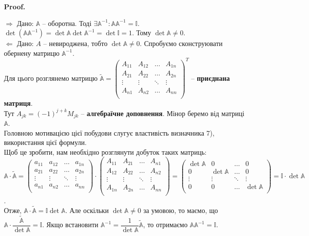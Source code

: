 \documentclass[a4paper, 10pt]{article}
\makeatletter
\def\rightproof{$\boxed{\Rightarrow}$ }
\def\leftproof{$\boxed{\Leftarrow}$ }
\theoremstyle{theoremdd}
\renewenvironment{proof}[1][Proof.\\]{\par
\pushQED{\hfill \qed}%
\normalfont \topsep6\p@\@plus6\p@\relax
\trivlist
\item\relax
{\bfseries
#1\@addpunct{.}}\hspace\labelsep\ignorespaces
}{%
\popQED\endtrivlist\@endpefalse
}
\makeatother
\begin{document}
\begin{proof}
\rightproof Дано: $\mathbb{A}$ -- оборотна. Тоді $\exists \mathbb{A}^{-1}: \mathbb{A} \mathbb{A}^{-1} = \mathbb{I}$.\\
$\det (\mathbb{A} \mathbb{A}^{-1}) = \det \mathbb{A} \det \mathbb{A}^{-1} = \det \mathbb{I} = 1$. Тому $\det \mathbb{A} \neq 0$.
\bigskip \\
\leftproof Дано: $A$ -- невироджена, тобто $\det \mathbb{A} \neq 0$. Спробуємо сконструювати обернену матрицю $\mathbb{A}^{-1}$.\\
Для цього розглянемо матрицю $\widetilde{\mathbb{A}} = \begin{pmatrix}
A_{11} & A_{12} & \dots & A_{1n} \\
A_{21} & A_{22} & \dots & A_{2n} \\
\vdots & \vdots & \ddots & \vdots \\
A_{n1} & A_{n2} & \dots & A_{nn} \\
\end{pmatrix}^T$ -- \textbf{приєднана матриця}. \\
Тут $A_{jk} = (-1)^{j+k}M_{jk}$ -- \textbf{алгебраїчне доповнення}. Мінор беремо від матриці $\mathbb{A}$.\\
Головною мотивацією цієї побудови слугує властивість визначника 7), використання цієї формули.\\
Щоб це зробити, нам необхідно розглянути добуток таких матриць:\\
$\mathbb{A} \cdot \widetilde{\mathbb{A}} = \begin{pmatrix}
a_{11} & a_{12} & \dots & a_{1n} \\
a_{21} & a_{22} & \dots & a_{2n} \\
\vdots & \vdots & \ddots & \vdots \\
a_{n1} & a_{n2} & \dots & a_{nn} \\
\end{pmatrix} \cdot \begin{pmatrix}
A_{11} & A_{21} & \dots & A_{n1} \\
A_{12} & A_{22} & \dots & A_{n2} \\
\vdots & \vdots & \ddots & \vdots \\
A_{1n} & A_{2n} & \dots & A_{nn} \\
\end{pmatrix} = \begin{pmatrix}
\det \mathbb{A} & 0 & \dots & 0 \\
0 & \det \mathbb{A} & \dots & 0 \\
\vdots & \vdots & \ddots & \vdots \\
0 & 0 & \dots & \det \mathbb{A} \\
\end{pmatrix} = \mathbb{I} \cdot \det \mathbb{A}$.\\
Отже, $\mathbb{A} \cdot \widetilde{\mathbb{A}} =\mathbb{I} \det \mathbb{A}$. Але оскільки $\det \mathbb{A} \neq 0$ за умовою, то маємо, що $\mathbb{A} \cdot \dfrac{\widetilde{\mathbb{A}}}{\det \mathbb{A}} = \mathbb{I}$. Якщо встановити $\mathbb{A}^{-1} = \dfrac{1}{\det \mathbb{A}} \widetilde{\mathbb{A}}$, то отримаємо $\mathbb{A} \mathbb{A}^{-1} = \mathbb{I}$.
\end{proof}
\end{document}
